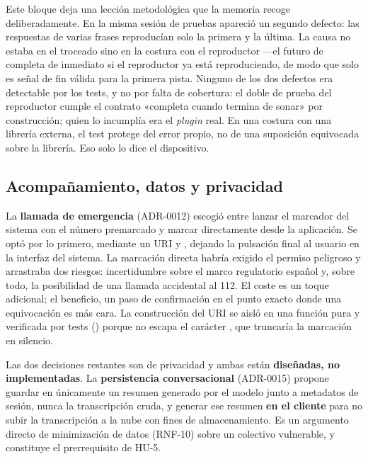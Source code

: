 Este bloque deja una lección metodológica que la memoria recoge deliberadamente. En la misma sesión de
pruebas apareció un segundo defecto: las respuestas de varias frases reproducían solo la primera y la
última. La causa no estaba en el troceado sino en la costura con el reproductor ---el futuro de
 completa de inmediato si el reproductor ya está reproduciendo, de modo que solo es señal de
fin válida para la primera pista. Ninguno de los dos defectos era detectable por los tests, y no por falta
de cobertura: el doble de prueba del reproductor cumple el contrato «completa cuando termina de sonar» por
construcción; quien lo incumplía era el \emph{plugin} real. En una costura con una librería externa, el
test protege del error propio, no de una suposición equivocada sobre la librería. Eso solo lo dice el
dispositivo.

\subsection{Acompañamiento, datos y privacidad}

La \textbf{llamada de emergencia} (ADR-0012) escogió entre lanzar el marcador del sistema con el número
premarcado y marcar directamente desde la aplicación. Se optó por lo primero, mediante un URI  y
, dejando la pulsación final al usuario en la interfaz del sistema. La marcación
directa habría exigido el permiso peligroso  y arrastraba dos riesgos: incertidumbre
sobre el marco regulatorio español y, sobre todo, la posibilidad de una llamada accidental al 112. El coste
es un toque adicional; el beneficio, un paso de confirmación en el punto exacto donde una equivocación es
más cara. La construcción del URI se aisló en una función pura y verificada por tests
() porque  no escapa el carácter \code{\#}, que truncaría la marcación en
silencio.

Las dos decisiones restantes son de privacidad y ambas están \textbf{diseñadas, no implementadas}. La
\textbf{persistencia conversacional} (ADR-0015) propone guardar en 
únicamente un resumen generado por el modelo junto a metadatos de sesión, nunca la transcripción cruda, y
generar ese resumen \textbf{en el cliente} para no subir la transcripción a la nube con fines de
almacenamiento. Es un argumento directo de minimización de datos (RNF-10) sobre un colectivo vulnerable, y
constituye el prerrequisito de HU-5.

